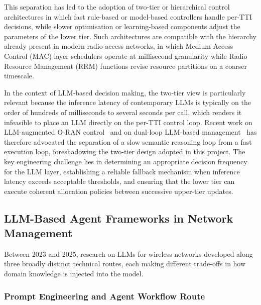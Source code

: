 This separation has led to the adoption of two-tier or hierarchical control architectures in which fast rule-based or model-based controllers handle per-TTI decisions, while slower optimisation or learning-based components adjust the parameters of the lower tier. Such architectures are compatible with the hierarchy already present in modern radio access networks, in which Medium Access Control (MAC)-layer schedulers operate at millisecond granularity while Radio Resource Management (RRM) functions revise resource partitions on a coarser timescale.

In the context of LLM-based decision making, the two-tier view is particularly relevant because the inference latency of contemporary LLMs is typically on the order of hundreds of milliseconds to several seconds per call, which renders it infeasible to place an LLM directly on the per-TTI control loop. Recent work on LLM-augmented O-RAN control~\cite{lotfi2025oranguide} and on dual-loop LLM-based management~\cite{qu2025dualloop} has therefore advocated the separation of a slow semantic reasoning loop from a fast execution loop, foreshadowing the two-tier design adopted in this project. The key engineering challenge lies in determining an appropriate decision frequency for the LLM layer, establishing a reliable fallback mechanism when inference latency exceeds acceptable thresholds, and ensuring that the lower tier can execute coherent allocation policies between successive upper-tier updates.

\subsection{LLM-Based Agent Frameworks in Network Management}

Between 2023 and 2025, research on LLMs for wireless networks developed along three broadly distinct technical routes, each making different trade-offs in how domain knowledge is injected into the model.

\subsubsection{Prompt Engineering and Agent Workflow Route}

